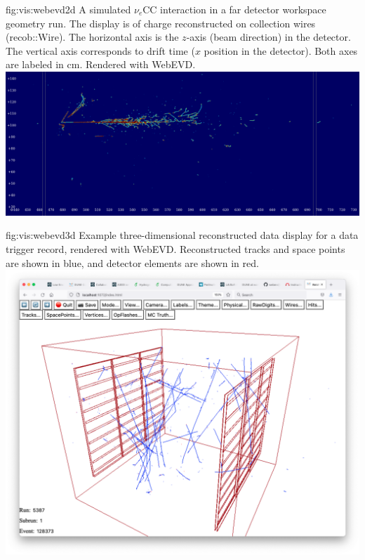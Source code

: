 \documentclass[../main-v1.tex]{subfiles}
\begin{document}
\begin{dunefigure}
{fig:vis:webevd2d} 
{A simulated $\nu_e$CC interaction in a far detector workspace geometry run. The display is of charge reconstructed on collection wires (recob::Wire). The horizontal axis is the $z$-axis (beam direction) in the detector. The vertical axis corresponds to drift time ($x$ position in the detector). Both axes are labeled in cm. Rendered with WebEVD. }
\includegraphics[width=0.9 \textwidth]{graphics/EventDisplays/webevd_nuecc_sim.png}
\end{dunefigure}

\begin{dunefigure}
{fig:vis:webevd3d} 
{ Example three-dimensional reconstructed data display for a  data trigger record, rendered with WebEVD. Reconstructed tracks and space points are shown in blue, and detector elements are shown in red.}
\includegraphics[width=0.9 \textwidth]{graphics/EventDisplays/webevd_pdsp3d.png}
\end{dunefigure}
\end{document}
